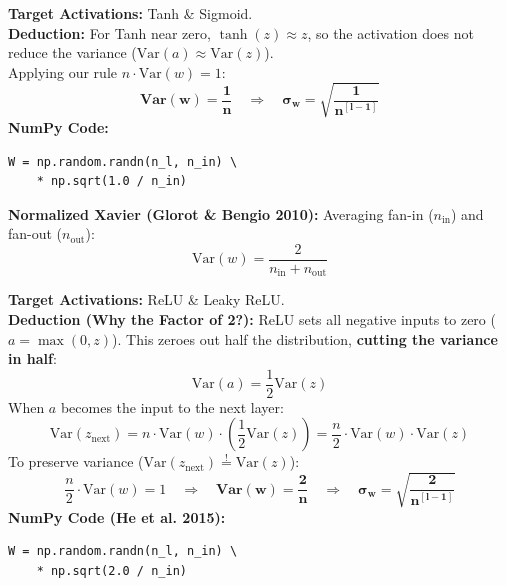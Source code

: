 \documentclass[10pt,a4paper]{article}
\begin{document}
\vspace{-6pt}

\noindent\begin{minipage}[t]{0.485\textwidth}
\begin{tcolorbox}[
    colframe=themeblue, colback=lightbg, coltitle=white,
    fonttitle=\bfseries\sffamily\small,
    title={1. Deducing Xavier Initialization (Tanh)},
    arc=1.3mm, boxrule=0.5pt, left=4pt, right=4pt, top=2pt, bottom=2pt
]
\footnotesize
\textbf{Target Activations:} Tanh \& Sigmoid.
\\[1.5pt]
\textbf{Deduction:}
For Tanh near zero, $\tanh(z) \approx z$, so the activation does not reduce the variance ($\text{Var}(a) \approx \text{Var}(z)$).
\\[1.5pt]
Applying our rule $n \cdot \text{Var}(w) = 1$:
\[
\mathbf{\text{Var}(w) = \frac{1}{n}} \quad\Longrightarrow\quad \mathbf{\sigma_w = \sqrt{\frac{1}{n^{[l-1]}}}}
\]
\textbf{NumPy Code:}
\begin{verbatim}
W = np.random.randn(n_l, n_in) \
    * np.sqrt(1.0 / n_in)
\end{verbatim}
\textbf{Normalized Xavier (Glorot \& Bengio 2010):}
Averaging fan-in ($n_{\text{in}}$) and fan-out ($n_{\text{out}}$):
\[
\text{Var}(w) = \frac{2}{n_{\text{in}} + n_{\text{out}}}
\]
\end{tcolorbox}
\end{minipage}
\hfill
\begin{minipage}[t]{0.485\textwidth}
\begin{tcolorbox}[
    colframe=accentgreen, colback=white, coltitle=white,
    fonttitle=\bfseries\sffamily\small,
    title={2. Deducing He Initialization (ReLU)},
    arc=1.3mm, boxrule=0.5pt, left=4pt, right=4pt, top=2pt, bottom=2pt
]
\footnotesize
\textbf{Target Activations:} ReLU \& Leaky ReLU.
\\[1.5pt]
\textbf{Deduction (Why the Factor of 2?):}
ReLU sets all negative inputs to zero ($a = \max(0, z)$). This zeroes out half the distribution, \textbf{cutting the variance in half}:
\[
\text{Var}(a) = \frac{1}{2}\text{Var}(z)
\]
When $a$ becomes the input to the next layer:
\[
\text{Var}(z_{\text{next}}) = n \cdot \text{Var}(w) \cdot \left(\frac{1}{2}\text{Var}(z)\right) = \frac{n}{2} \cdot \text{Var}(w) \cdot \text{Var}(z)
\]
To preserve variance ($\text{Var}(z_{\text{next}}) \stackrel{!}{=} \text{Var}(z)$):
\[
\frac{n}{2} \cdot \text{Var}(w) = 1 \quad\Longrightarrow\quad \mathbf{\text{Var}(w) = \frac{2}{n}} \quad\Longrightarrow\quad \mathbf{\sigma_w = \sqrt{\frac{2}{n^{[l-1]}}}}
\]
\textbf{NumPy Code (He et al. 2015):}
\begin{verbatim}
W = np.random.randn(n_l, n_in) \
    * np.sqrt(2.0 / n_in)
\end{verbatim}
\end{tcolorbox}
\end{minipage}
\end{document}
